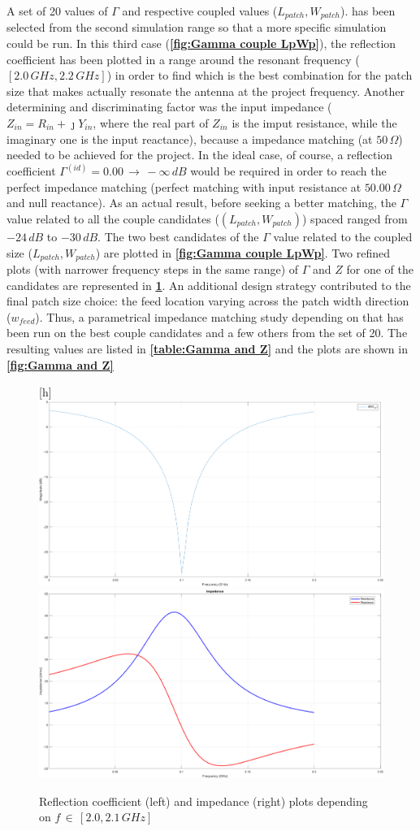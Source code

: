 \documentclass[12pt,a4paper]{article}
\begin{document}
{A set of 20 values of $\Gamma$ and respective coupled values ($L_{patch},W_{patch}$). has been selected from the second simulation range so that a more specific simulation could be run. In this third case (\textbf{\cref{fig:Gamma couple LpWp}}), the reflection coefficient has been plotted in a range around the resonant frequency ($[2.0\,GHz, 2.2\,GHz]$) in order to find which is the best combination for the patch size that makes actually resonate the antenna at the project frequency. Another determining and discriminating factor was the input impedance ($Z_{in}=R_{in}+\jmath Y_{in}$, where the real part of $Z_{in}$ is the imput resistance, while the imaginary one is the input reactance), because a impedance matching (at $50\,\Omega$) needed to be achieved for the project. In the ideal case, of course, a reflection coefficient $\Gamma^{(id)}=0.00\,\to\,-\infty\,dB$ would be required in order to reach the perfect impedance matching (perfect matching with input resistance at $50.00\,\Omega$ and null reactance). As an actual result, before seeking a better matching, the $\Gamma$ value related to all the couple candidates ($(L_{patch},W_{patch})$) spaced ranged from $-24\,dB$ to $-30\,dB$. The two best candidates of the $\Gamma$ value related to the coupled size ($L_{patch},W_{patch}$) are plotted in \textbf{\cref{fig:Gamma couple LpWp}}. Two refined plots (with narrower frequency steps in the same range) of $\Gamma$ and $Z$ for one of the candidates are represented in \textbf{\cref{fig:Gamma and Z previa wfeed}}. An additional design strategy contributed to the final patch size choice: the feed location varying across the patch width direction ($w_{feed}$). Thus, a parametrical impedance matching study depending on that has been run on the best couple candidates and a few others from the set of 20. The resulting values are listed in \textbf{\cref{table:Gamma and Z}} and the plots are shown in \textbf{\cref{fig:Gamma and Z}}
	\begin{figure}
		\begin{center}[h]
		\includegraphics[width = 0.5\linewidth]{gamma.png}
		\includegraphics[width = 0.5\linewidth]{impedances.png}
		\caption{Reflection coefficient (left) and impedance (right) plots depending on $f\,\in\,[2.0,2.1\,GHz]$}
        \label{fig:Gamma and Z previa wfeed}
	\end{center}
	\end{figure}

}
\end{document}

